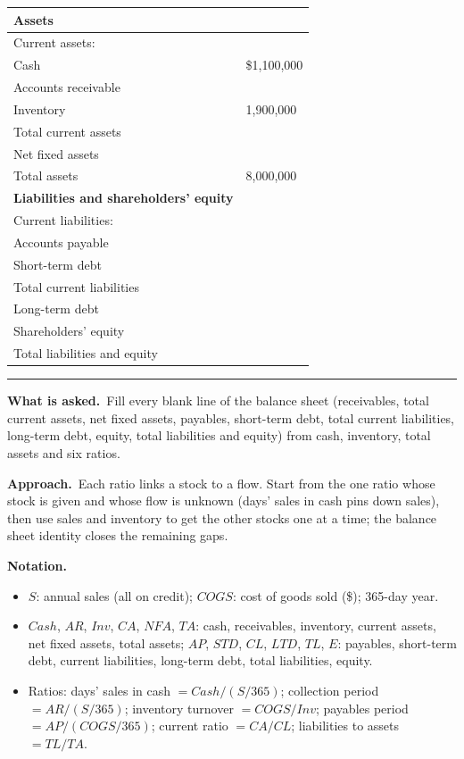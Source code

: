 \documentclass[11pt,a4paper]{article}
\newcommand{\notation}{\par\noindent\textbf{Notation.}}
\newcommand{\asked}{\par\medskip\noindent\textbf{What is asked.}~}
\newcommand{\approach}{\par\smallskip\noindent\textbf{Approach.}~}
\newcommand{\stmtend}{\par\endgroup\nopagebreak\noindent\rule{\linewidth}{0.4pt}\par\medskip}
\begin{document}
{\def\LTcaptype{none} %
\begin{longtable}[]{@{}ll@{}}
\toprule\noalign{}
Assets & \\
\midrule\noalign{}
\endhead
\bottomrule\noalign{}
\endlastfoot
Current assets: & \\
Cash & \$1,100,000 \\
Accounts receivable & \\
Inventory & 1,900,000 \\
Total current assets & \\
Net fixed assets & \\
Total assets & 8,000,000 \\
\textbf{Liabilities and shareholders' equity} & \\
Current liabilities: & \\
Accounts payable & \\
Short-term debt & \\
Total current liabilities & \\
Long-term debt & \\
Shareholders' equity & \\
Total liabilities and equity & \\
\end{longtable}
}
\stmtend

\asked Fill every blank line of the balance sheet (receivables, total current assets, net fixed
assets, payables, short-term debt, total current liabilities, long-term debt, equity, total
liabilities and equity) from cash, inventory, total assets and six ratios.

\approach Each ratio links a stock to a flow. Start from the one ratio whose stock is given and
whose flow is unknown (days' sales in cash pins down sales), then use sales and inventory to get
the other stocks one at a time; the balance sheet identity closes the remaining gaps.

\notation
\begin{itemize}
  \item $S$: annual sales (all on credit); $COGS$: cost of goods sold (\$); 365-day year.
  \item $Cash$, $AR$, $Inv$, $CA$, $NFA$, $TA$: cash, receivables, inventory, current assets,
        net fixed assets, total assets; $AP$, $STD$, $CL$, $LTD$, $TL$, $E$: payables, short-term
        debt, current liabilities, long-term debt, total liabilities, equity.
  \item Ratios: days' sales in cash $= Cash/(S/365)$; collection period $= AR/(S/365)$; inventory
        turnover $= COGS/Inv$; payables period $= AP/(COGS/365)$; current ratio $= CA/CL$;
        liabilities to assets $= TL/TA$.
\end{itemize}
\end{document}
